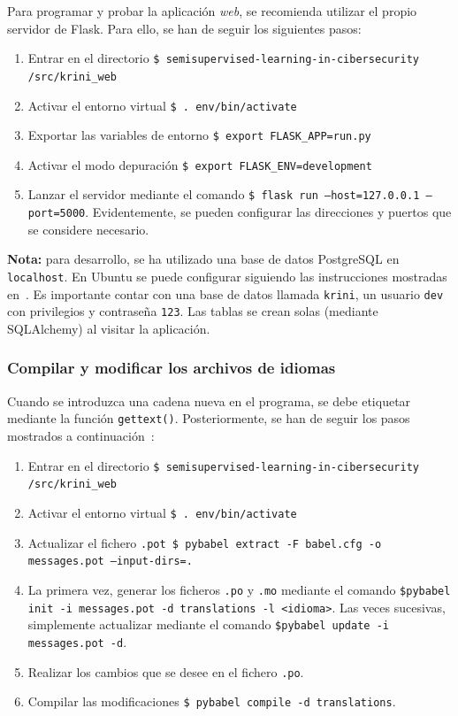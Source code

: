 Para programar y probar la aplicación \textit{web}, se recomienda utilizar el propio servidor de Flask. Para ello, se han de seguir los siguientes pasos:

\begin{enumerate}
	\item Entrar en el directorio \texttt{\$ semisupervised-learning-in-cibersecurity /src/krini\_web}
	\item Activar el entorno virtual \texttt{\$ . env/bin/activate}
	\item Exportar las variables de entorno \texttt{\$ export FLASK\_APP=run.py}
	\item Activar el modo depuración \texttt{\$ export FLASK\_ENV=development}
	\item Lanzar el servidor mediante el comando \texttt{\$ flask run --host=127.0.0.1 --port=5000}. Evidentemente, se pueden configurar las direcciones y puertos que se considere necesario.
\end{enumerate}

\textbf{Nota:} para desarrollo, se ha utilizado una base de datos PostgreSQL en \texttt{localhost}. En Ubuntu se puede configurar siguiendo las instrucciones mostradas en~\cite{postgrelocal}. Es importante contar con una base de datos llamada \texttt{krini}, un usuario \texttt{dev} con privilegios y contraseña \texttt{123}. Las tablas se crean solas (mediante SQLAlchemy) al visitar la aplicación.

\subsubsection{Compilar y modificar los archivos de idiomas}

Cuando se introduzca una cadena nueva en el programa, se debe etiquetar mediante la función \texttt{gettext()}. Posteriormente, se han de seguir los pasos mostrados a continuación~\cite{pybabelmanual}:

\begin{enumerate}
	\item Entrar en el directorio \texttt{\$ semisupervised-learning-in-cibersecurity /src/krini\_web}
	\item Activar el entorno virtual \texttt{\$ . env/bin/activate}
	\item Actualizar el fichero \texttt{.pot \$ pybabel extract -F babel.cfg -o} 
	\texttt{ messages.pot --input-dirs=. }
	\item La primera vez, generar los ficheros \texttt{.po} y \texttt{.mo} mediante el comando \texttt{\$pybabel init -i messages.pot -d translations -l <idioma>}. Las veces sucesivas, simplemente actualizar mediante el comando \texttt{\$pybabel update -i messages.pot -d}.
	\item Realizar los cambios que se desee en el fichero \texttt{.po}.
	\item Compilar las modificaciones \texttt{\$ pybabel compile -d translations}. 
\end{enumerate}



